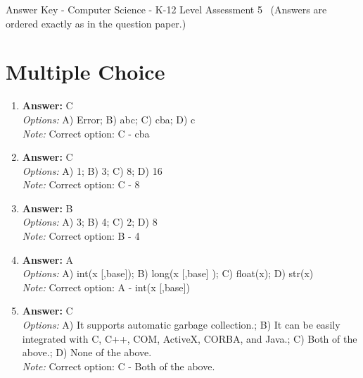 \documentclass[12pt]{article}
\begin{document}
\begin{center}
Answer Key - Computer Science - K-12 Level Assessment 5 \
\small (Answers are ordered exactly as in the question paper.)
\end{center}

\section*{Multiple Choice}
\begin{enumerate}[label=\arabic*.]
\item \textbf{Answer:} C
\\ \textit{Options:} A) Error; B) abc; C) cba; D) c
\\ \textit{Note:} Correct option: C - cba
\item \textbf{Answer:} C
\\ \textit{Options:} A) 1; B) 3; C) 8; D) 16
\\ \textit{Note:} Correct option: C - 8
\item \textbf{Answer:} B
\\ \textit{Options:} A) 3; B) 4; C) 2; D) 8
\\ \textit{Note:} Correct option: B - 4
\item \textbf{Answer:} A
\\ \textit{Options:} A) int(x [,base]); B) long(x [,base] ); C) float(x); D) str(x)
\\ \textit{Note:} Correct option: A - int(x [,base])
\item \textbf{Answer:} C
\\ \textit{Options:} A) It supports automatic garbage collection.; B) It can be easily integrated with C, C++, COM, ActiveX, CORBA, and Java.; C) Both of the above.; D) None of the above.
\\ \textit{Note:} Correct option: C - Both of the above.
\end{enumerate}
\end{document}
